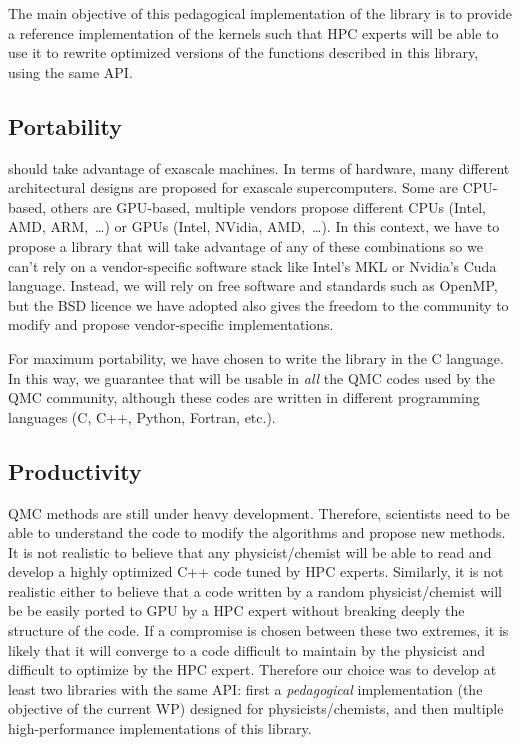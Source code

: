 The main objective of this pedagogical implementation of the library
is to provide a reference implementation of the kernels such that
\ac{HPC} experts will be able to use it to rewrite optimized versions
of the functions described in this library, using the same \ac{API}.

\subsection{Portability}

\QMCkl{} should take advantage of exascale machines. In terms of hardware,
many different architectural designs are proposed for exascale
supercomputers. Some are CPU-based, others are \ac{GPU}-based, multiple vendors
propose different CPUs (Intel, AMD, ARM,~\dots) or \acp{GPU} (Intel,
NVidia, AMD,~\dots). In this context, we have to propose a library that
will take advantage of any of these combinations so we can't rely on 
a vendor-specific software stack like Intel's \ac{MKL} or Nvidia's
Cuda language. Instead, we
will rely on free software and standards such as OpenMP, but the BSD
licence we have adopted also gives the freedom to the community to
modify \QMCkl{} and propose vendor-specific implementations.

For maximum portability, we have chosen to write the library in the C
language. In this way, we guarantee that \QMCkl{} will be usable in
\emph{all} the QMC codes used by the \ac{QMC} community, although these
codes are written in different programming languages (C, C++, Python,
Fortran, etc.).

\subsection{Productivity}

\ac{QMC} methods are still under heavy development. Therefore,
scientists need to be able to understand the code to modify the
algorithms and propose new methods. It is not realistic to believe
that any physicist/chemist will be able to read and develop a highly optimized
C++ code tuned by \ac{HPC} experts. Similarly, it is not realistic
either to believe that a code written by a random physicist/chemist will
be be easily ported to \ac{GPU} by a \ac{HPC} expert without breaking deeply the
structure of the code. If a compromise
is chosen between these two extremes, it is likely that it will
converge to a code difficult to maintain by the physicist and
difficult to optimize by the \ac{HPC} expert. Therefore our choice was to
develop at least two libraries with the same \ac{API}: first a
\emph{pedagogical} implementation (the objective of the current \ac{WP})
designed for physicists/chemists, and then multiple high-performance
implementations of this library.


